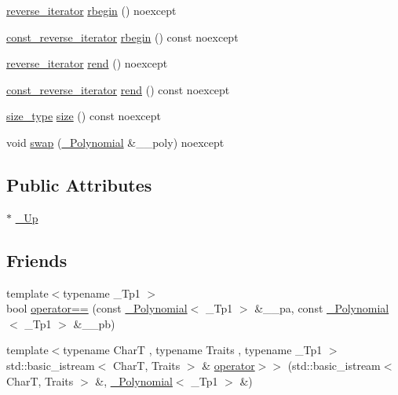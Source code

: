 \begin{DoxyCompactItemize}
\item 
\hyperlink{class____gnu__cxx_1_1__Polynomial_aed8f7d97c575d5c34c54170631953415}{reverse\+\_\+iterator} \hyperlink{class____gnu__cxx_1_1__Polynomial_a10924e0d5e228684c721a4bba73a7af3}{rbegin} () noexcept
\item 
\hyperlink{class____gnu__cxx_1_1__Polynomial_a2a042a80127ab9a7b0349a54791e59af}{const\+\_\+reverse\+\_\+iterator} \hyperlink{class____gnu__cxx_1_1__Polynomial_ab5cd3c6e861ebf3adac38e3df4e099aa}{rbegin} () const noexcept
\item 
\hyperlink{class____gnu__cxx_1_1__Polynomial_aed8f7d97c575d5c34c54170631953415}{reverse\+\_\+iterator} \hyperlink{class____gnu__cxx_1_1__Polynomial_a8373c6b9a787a52798e4319906858d33}{rend} () noexcept
\item 
\hyperlink{class____gnu__cxx_1_1__Polynomial_a2a042a80127ab9a7b0349a54791e59af}{const\+\_\+reverse\+\_\+iterator} \hyperlink{class____gnu__cxx_1_1__Polynomial_abeca4b1cffc4a52db34375b99b6d3d11}{rend} () const noexcept
\item 
\hyperlink{class____gnu__cxx_1_1__Polynomial_a8b25fcfd4acaad0c5c08b649c22da28a}{size\+\_\+type} \hyperlink{class____gnu__cxx_1_1__Polynomial_aa0ae73f79d58962dc4f1e4df2d2cc0d2}{size} () const noexcept
\item 
void \hyperlink{class____gnu__cxx_1_1__Polynomial_aec8b248101f7340d46fbac13b07b45bc}{swap} (\hyperlink{class____gnu__cxx_1_1__Polynomial}{\+\_\+\+Polynomial} \&\+\_\+\+\_\+poly) noexcept
\end{DoxyCompactItemize}
\subsection*{Public Attributes}
\begin{DoxyCompactItemize}
\item 
$\ast$ \hyperlink{class____gnu__cxx_1_1__Polynomial_a242114d4b86648a5dff67a8221f80d40}{\+\_\+\+Up}
\end{DoxyCompactItemize}
\subsection*{Friends}
\begin{DoxyCompactItemize}
\item 
{\footnotesize template$<$typename \+\_\+\+Tp1 $>$ }\\bool \hyperlink{class____gnu__cxx_1_1__Polynomial_abb21e2bfe0dc97a44ae9eeffb6f930aa}{operator==} (const \hyperlink{class____gnu__cxx_1_1__Polynomial}{\+\_\+\+Polynomial}$<$ \+\_\+\+Tp1 $>$ \&\+\_\+\+\_\+pa, const \hyperlink{class____gnu__cxx_1_1__Polynomial}{\+\_\+\+Polynomial}$<$ \+\_\+\+Tp1 $>$ \&\+\_\+\+\_\+pb)
\item 
{\footnotesize template$<$typename CharT , typename Traits , typename \+\_\+\+Tp1 $>$ }\\std\+::basic\+\_\+istream$<$ CharT, Traits $>$ \& \hyperlink{class____gnu__cxx_1_1__Polynomial_a929d1753cc00510f102f61a2bbeb0d2d}{operator$>$$>$} (std\+::basic\+\_\+istream$<$ CharT, Traits $>$ \&, \hyperlink{class____gnu__cxx_1_1__Polynomial}{\+\_\+\+Polynomial}$<$ \+\_\+\+Tp1 $>$ \&)
\end{DoxyCompactItemize}


